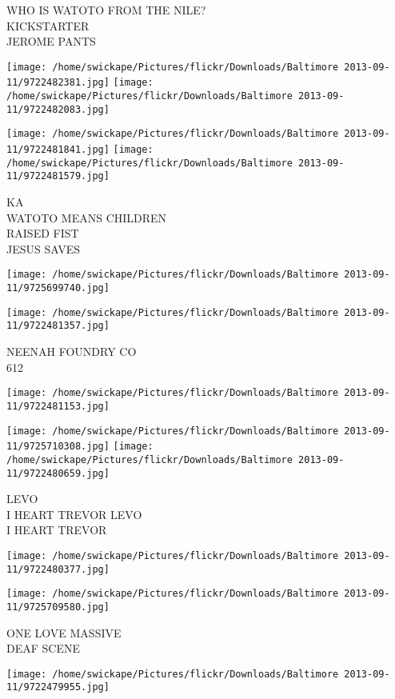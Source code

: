 \documentclass[10pt,letterpaper]{article}
\begin{document}
WHO IS WATOTO FROM THE NILE?\\
KICKSTARTER\\
JEROME PANTS
\pagebreak

\texttt{[image: /home/swickape/Pictures/flickr/Downloads/Baltimore 2013-09-11/9722482381.jpg]}
\texttt{[image: /home/swickape/Pictures/flickr/Downloads/Baltimore 2013-09-11/9722482083.jpg]}

\texttt{[image: /home/swickape/Pictures/flickr/Downloads/Baltimore 2013-09-11/9722481841.jpg]}
\texttt{[image: /home/swickape/Pictures/flickr/Downloads/Baltimore 2013-09-11/9722481579.jpg]}

KA\\
WATOTO MEANS CHILDREN\\
RAISED FIST\\
JESUS SAVES
\pagebreak

\texttt{[image: /home/swickape/Pictures/flickr/Downloads/Baltimore 2013-09-11/9725699740.jpg]}

\vspace{0.25in}
\texttt{[image: /home/swickape/Pictures/flickr/Downloads/Baltimore 2013-09-11/9722481357.jpg]}

NEENAH FOUNDRY CO\\
612
\pagebreak

\texttt{[image: /home/swickape/Pictures/flickr/Downloads/Baltimore 2013-09-11/9722481153.jpg]}

\vspace{0.25in}
\texttt{[image: /home/swickape/Pictures/flickr/Downloads/Baltimore 2013-09-11/9725710308.jpg]}
\texttt{[image: /home/swickape/Pictures/flickr/Downloads/Baltimore 2013-09-11/9722480659.jpg]}

LEVO\\
I HEART TREVOR LEVO\\
I HEART TREVOR
\pagebreak

\texttt{[image: /home/swickape/Pictures/flickr/Downloads/Baltimore 2013-09-11/9722480377.jpg]}

\vspace{0.25in}
\texttt{[image: /home/swickape/Pictures/flickr/Downloads/Baltimore 2013-09-11/9725709580.jpg]}

ONE LOVE MASSIVE\\
DEAF SCENE
\pagebreak

\texttt{[image: /home/swickape/Pictures/flickr/Downloads/Baltimore 2013-09-11/9722479955.jpg]}
\end{document}
